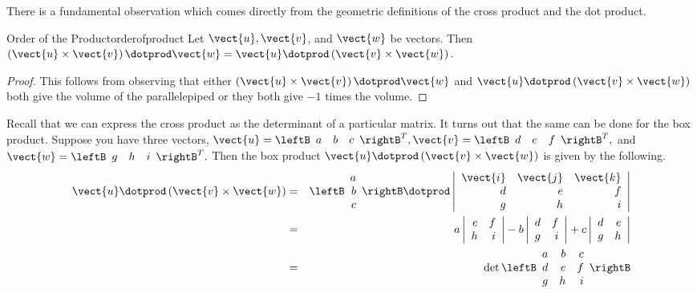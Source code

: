 There is a fundamental observation which comes directly from the geometric
definitions of the cross product and the dot product.

\begin{proposition}{Order of the Product}{orderofproduct}
Let $\vect{u},\vect{v}$, and $\vect{w}$ be vectors. Then $\left(
\vect{u}\times \vect{v}\right) \dotprod \vect{w}=\vect{u}\dotprod \left( \vect{v}\times \vect{w}
\right) .$
\end{proposition}

\begin{proof}This follows from observing that either 
$\left( \vect{u}\times \vect{v}\right) \dotprod \vect{w}$ and $\vect{u}\dotprod 
\left( \vect{v}\times \vect{w}\right) $ both give the volume of the parallelepiped or they both
give $-1$ times the volume.
\end{proof}

Recall that we can express the cross product as the determinant of a particular matrix. It turns out
that the same can be done for the box product. 
Suppose you have three vectors, $\vect{u}=\leftB
\begin{array}{rrr}
a & b & c
\end{array}
\rightB^T ,\vect{v}=\leftB
\begin{array}{rrr}
 d & e & f
\end{array}
\rightB^T ,$ and $\vect{w}=\leftB
\begin{array}{rrr}
g & h & i
\end{array}
\rightB^T .$ Then the box product $\vect{u}\dotprod \left(\vect{v}\times \vect{w}\right)$ is given by the following.
\begin{eqnarray*}
\vect{u}\dotprod \left(\vect{v}\times \vect{w}\right) &=&
\leftB 
\begin{array}{r}
a \\
b \\
c
\end{array}
\rightB \dotprod \left|
\begin{array}{rrr}
\vect{i} & \vect{j} & \vect{k} \\
d & e & f \\
g & h & i
\end{array}
\right| \\
&=&a\left|
\begin{array}{rr}
e & f \\
h & i
\end{array}
\right| -b\left|
\begin{array}{rr}
d & f \\
g & i
\end{array}
\right| +c\left|
\begin{array}{rr}
d & e \\
g & h
\end{array}
\right| \\
&= &\det \leftB
\begin{array}{rrr}
a & b & c \\
d & e & f \\
g & h & i
\end{array}
\rightB 
\end{eqnarray*}

